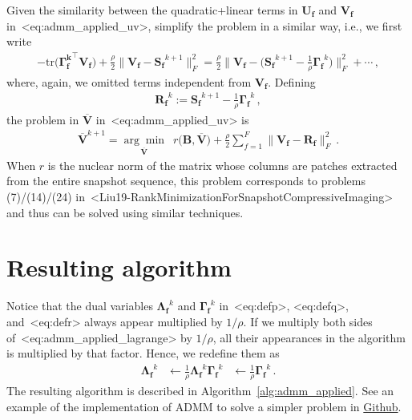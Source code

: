 \documentclass[a4paper,11pt]{article}
\def\\{}%
\def\cite#1{<#1>}%
\def\eqref#1{<#1>}%
\newcommand{\mypar}[1]{\bigskip\noindent {\bf #1.}}
\begin{document}
\mypar{Problem in $\overline{\bm{V}}$}
Given the similarity between the quadratic+linear terms in $\bm{U_f}$ and
$\bm{V_f}$ in~\eqref{eq:admm_applied_uv}, simplify the problem in a similar
way, i.e., we first write
\begin{align*}
  -\text{tr}\big(\bm{{\Gamma_f^k}}^\top \bm{V_f}\big)
  +
  \frac{\rho}{2} \big\|\bm{V_f} - \bm{S_f}^{k+1}\big\|_F^2
  =
  \frac{\rho}{2}
  \Big\|\bm{V_f} - \big(\bm{S_f}^{k+1} - \frac{1}{\rho}\bm{\Gamma_f}^k\big)\Big\|_F^2
  +
  \cdots\,,
\end{align*}
where, again, we omitted terms independent from $\bm{V_f}$. Defining
\begin{align}
  \label{eq:defr}
  \bm{R_f}^k 
  :=
  \bm{S_f}^{k+1} - \frac{1}{\rho}\bm{\Gamma_f}^k\,, 
\end{align}
the problem in $\overline{\bm{V}}$ in~\eqref{eq:admm_applied_uv} is
\begin{align}
  \label{eq:probvgeneric}
  \overline{\bm{V}}^{k+1}
  =
  \underset{\overline{\bm{V}}}{\arg\min}\,\,\,
  r\big(\bm{B}, \overline{\bm{V}}\big)
  +
  \frac{\rho}{2}
  \sum_{f=1}^{F} 
  \big\|\bm{V_f} - \bm{R_f}\big\|_F^2\,.
\end{align}
When $r$ is the nuclear norm of the matrix whose columns are patches extracted
from the entire snapshot sequence, this problem corresponds to problems
(7)/(14)/(24) in~\cite{Liu19-RankMinimizationForSnapshotCompressiveImaging} and
thus can be solved using similar techniques.

\section{Resulting algorithm}

Notice that the dual variables $\bm{\Lambda_f}^k$ and $\bm{\Gamma_f}^k$
in~\eqref{eq:defp}, \eqref{eq:defq}, and~\eqref{eq:defr} always appear
multiplied by $1/\rho$. If we multiply both sides
of~\eqref{eq:admm_applied_lagrange} by $1/\rho$, all their appearances in the
algorithm is multiplied by that factor. Hence, we redefine them as
\begin{align*}
  \bm{\Lambda_f}^k &\leftarrow  \frac{1}{\rho}\bm{\Lambda_f}^k
  \\
  \bm{\Gamma_f}^k &\leftarrow  \frac{1}{\rho}\bm{\Gamma_f}^k\,.
\end{align*}
The resulting algorithm is described in Algorithm~\ref{alg:admm_applied}.
See
an example of the implementation of ADMM to solve a simpler problem in 
\href{https://github.com/marijavella/sr-via-CNNs-and-tvtv/blob/master/code/TVTV_Solver_CPU.m}{Github}.
\end{document}
